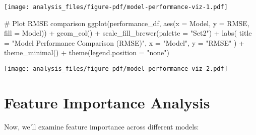\documentclass[
  letterpaper,
  DIV=11,
  numbers=noendperiod]{scrreprt}
\newenvironment{Shaded}{\begin{snugshade}}{\end{snugshade}}
\newcommand{\AttributeTok}[1]{\textcolor[rgb]{0.40,0.45,0.13}{#1}}
\newcommand{\CommentTok}[1]{\textcolor[rgb]{0.37,0.37,0.37}{#1}}
\newcommand{\FunctionTok}[1]{\textcolor[rgb]{0.28,0.35,0.67}{#1}}
\newcommand{\NormalTok}[1]{\textcolor[rgb]{0.00,0.23,0.31}{#1}}
\newcommand{\SpecialCharTok}[1]{\textcolor[rgb]{0.37,0.37,0.37}{#1}}
\newcommand{\StringTok}[1]{\textcolor[rgb]{0.13,0.47,0.30}{#1}}
\begin{document}
\texttt{[image: analysis\_files/figure-pdf/model-performance-viz-1.pdf]}

\begin{Shaded}
\begin{Highlighting}[]
\CommentTok{\# Plot RMSE comparison}
\FunctionTok{ggplot}\NormalTok{(performance\_df, }\FunctionTok{aes}\NormalTok{(}\AttributeTok{x =}\NormalTok{ Model, }\AttributeTok{y =}\NormalTok{ RMSE, }\AttributeTok{fill =}\NormalTok{ Model)) }\SpecialCharTok{+}
  \FunctionTok{geom\_col}\NormalTok{() }\SpecialCharTok{+}
  \FunctionTok{scale\_fill\_brewer}\NormalTok{(}\AttributeTok{palette =} \StringTok{"Set2"}\NormalTok{) }\SpecialCharTok{+}
  \FunctionTok{labs}\NormalTok{(}
    \AttributeTok{title =} \StringTok{"Model Performance Comparison (RMSE)"}\NormalTok{,}
    \AttributeTok{x =} \StringTok{"Model"}\NormalTok{,}
    \AttributeTok{y =} \StringTok{"RMSE"}
\NormalTok{  ) }\SpecialCharTok{+}
  \FunctionTok{theme\_minimal}\NormalTok{() }\SpecialCharTok{+}
  \FunctionTok{theme}\NormalTok{(}\AttributeTok{legend.position =} \StringTok{"none"}\NormalTok{)}
\end{Highlighting}
\end{Shaded}

\texttt{[image: analysis\_files/figure-pdf/model-performance-viz-2.pdf]}

\section{Feature Importance Analysis}\label{feature-importance-analysis}

Now, we'll examine feature importance across different models:
\end{document}
